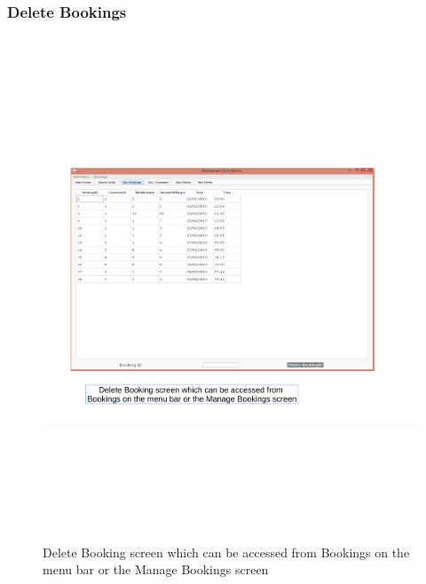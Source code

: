 \begin{landscape}
\subsubsection{Delete Bookings}
\begin{figure}[H]
    \includegraphics[height = 15cm]{./Maintenance/images/screen4}
    \caption{Delete Booking screen which can be accessed from Bookings on the menu bar or the Manage Bookings screen} \label{fig:screen4}
\end{figure}


\end{landscape}
